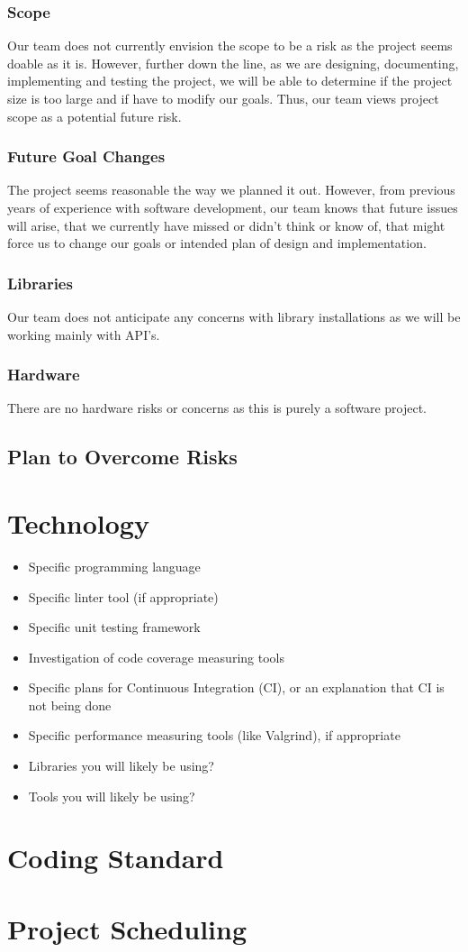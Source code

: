 \documentclass{article}
\begin{document}
\subsubsection{Scope}
Our team does not currently envision the scope to be a risk as the project seems doable as it is. However, further down the line, as we are designing, documenting, implementing and testing the project, we will be able to determine if the project size is too large and if have to modify our goals. Thus, our team views project scope as a potential future risk.

\subsubsection{Future Goal Changes}
The project seems reasonable the way we planned it out. However, from previous years of experience with software development, our team knows that future issues will arise, that we currently have missed or didn't think or know of, that might force us to change our goals or intended plan of design and implementation.

\subsubsection{Libraries}
Our team does not anticipate any concerns with library installations as we will be working mainly with API's.

\subsubsection{Hardware}
There are no hardware risks or concerns as this is purely a software project.

\subsection{Plan to Overcome Risks}


\section{Technology}

\begin{itemize}
	\item Specific programming language
	\item Specific linter tool (if appropriate)
	\item Specific unit testing framework
	\item Investigation of code coverage measuring tools
	\item Specific plans for Continuous Integration (CI), or an explanation that CI
	is not being done
	\item Specific performance measuring tools (like Valgrind), if
	appropriate
	\item Libraries you will likely be using?
	\item Tools you will likely be using?
\end{itemize}

\section{Coding Standard}

\section{Project Scheduling}

\end{document}
